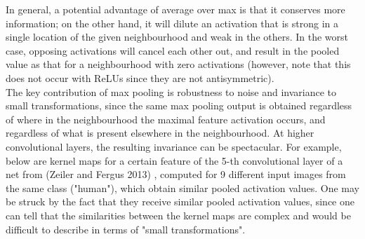 \documentclass[a4paper,11pt]{article}
\begin{document}
In general, a potential advantage of average over max is that it conserves more information; on the other hand, it will dilute an activation that is strong in a single location of the given neighbourhood and weak in the others. In the worst case, opposing activations will cancel each other out, and result in the pooled value as that for a neighbourhood with zero activations (however, note that this does not occur with ReLUs since they are not antisymmetric). \\

The key contribution of max pooling is robustness to noise and invariance to small transformations, since the same max pooling output is obtained regardless of where in the neighbourhood the maximal feature activation occurs, and regardless of what is present elsewhere in the neighbourhood. At higher convolutional layers, the resulting invariance can be spectacular. For example, below are kernel maps for a certain feature of the 5-th convolutional layer of a net from (Zeiler and Fergus 2013) \cite{zeiler_fergus}, computed for 9 different input images from the same class ("human"), which obtain similar pooled activation values. One may be struck by the fact that they receive similar pooled activation values, since one can tell that the similarities between the kernel maps are complex and would be difficult to describe in terms of "small transformations". \\
\end{document}
